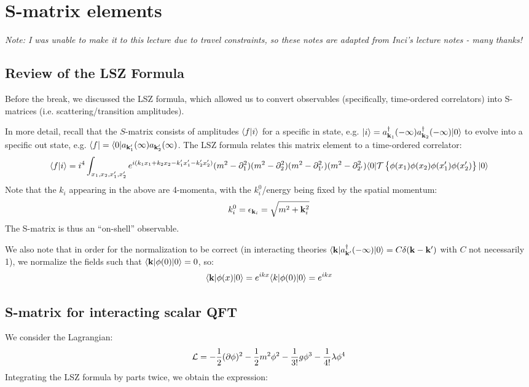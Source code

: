 \section{S-matrix elements}
\emph{Note: I was unable to make it to this lecture due to travel constraints, so these notes are adapted from Inci's lecture notes - many thanks!}

\subsection{Review of the LSZ Formula}
Before the break, we discussed the LSZ formula, which allowed us to convert observables (specifically, time-ordered correlators) into S-matrices (i.e. scattering/transition amplitudes).

In more detail, recall that the $S$-matrix consists of amplitudes $\langle f \lvert i \rangle$ for a specific in state, e.g. $\lvert i \rangle = a^\dagger_{\mathbf{k}_1}(-\infty)a^\dagger_{\mathbf{k}_2}(-\infty)\lvert 0 \rangle$ to evolve into a specific out state, e.g. $\langle f \rvert = \langle 0 \rvert a_{\mathbf{k}_1'}(\infty)a_{\mathbf{k}_2'}(\infty)$. The LSZ formula relates this matrix element to a time-ordered correlator:
\begin{equation}
    \langle f \lvert i \rangle = i^4\int_{x_1, x_2, x_1', x_2'}e^{i(k_1x_1 + k_2x_2 - k_1'x_1' - k_2'x_2')}(m^2 - \partial_1^2)(m^2 - \partial_2^2)(m^2 - \partial_{1'}^2)(m^2 - \partial_{2'}^2)\langle 0 \rvert\mathcal{T}\set{\phi(x_1)\phi(x_2)\phi(x_1')\phi(x_2')}\lvert 0 \rangle
\end{equation}
Note that the $k_i$ appearing in the above are 4-momenta, with the $k_i^0$/energy being fixed by the spatial momentum:
\begin{equation}
    k_i^0 = \epsilon_{\mathbf{k}_i} = \sqrt{m^2 + \mathbf{k}_i^2}
\end{equation}
The S-matrix is thus an ``on-shell'' observable.

We also note that in order for the normalization to be correct (in interacting theories $\langle \mathbf{k} \rvert a_{\mathbf{k}'}^\dagger(-\infty)\lvert 0 \rangle = C\delta(\mathbf{k} - \mathbf{k'})$ with $C$ not necessarily 1), we normalize the fields such that $\langle \mathbf{k} \rvert\phi(0)\lvert 0 \rangle = 0$, so:
\begin{equation}
    \langle \mathbf{k} \rvert\phi(x)\lvert 0 \rangle = e^{ikx}\langle k \rvert\phi(0)\lvert 0 \rangle = e^{ikx}
\end{equation}

\subsection{S-matrix for interacting scalar QFT}
We consider the Lagrangian:
\begin{equation}
    \mathcal{L} = -\frac{1}{2}(\partial\phi)^2 - \frac{1}{2}m^2\phi^2 - \frac{1}{3!}g\phi^3 - \frac{1}{4!}\lambda\phi^4
\end{equation}
Integrating the LSZ formula by parts twice, we obtain the expression:

